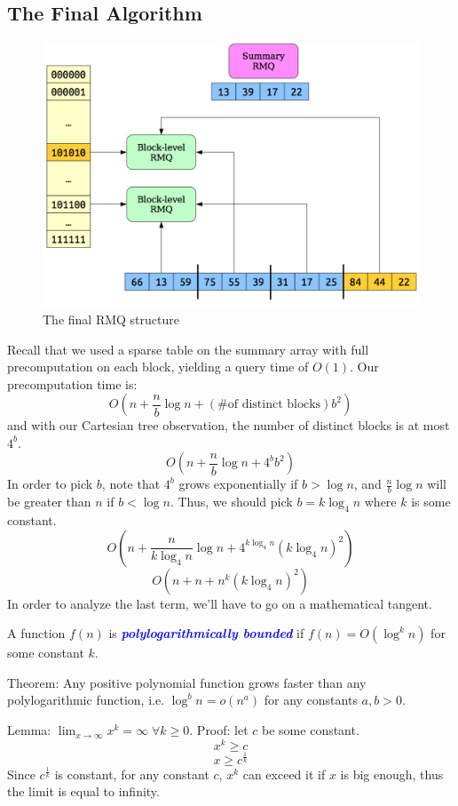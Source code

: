 \documentclass[11pt, oneside]{article}
\newcommand{\emphasis}[1]{\textcolor{blue}{\textbf{\textit{#1}}}}
\begin{document}
\subsection{The Final Algorithm}

\begin{figure}[h]
\centering
\includegraphics[scale=0.25]{final}
\caption{The final RMQ structure}
\end{figure}

Recall that we used a sparse table on the summary array with full precomputation on each block,
yielding a query time of \( O(1) \). Our precomputation time is:
\[ O(n + \frac{n}{b} \log n + (\text{\# of distinct blocks}) b^2) \]
and with our Cartesian tree observation, the number of distinct blocks is at most \( 4^b \).
\[ O(n + \frac{n}{b} \log n + 4^b b^2) \]
In order to pick \( b \), note that \( 4^b \) grows exponentially if \( b > \log n \), and \( \frac{n}{b} \log n \)
will be greater than \( n \) if \( b < \log n \). Thus, we should pick \( b = k \log_4 n \) where \( k \) is some constant.
\[ O(n + \frac{n}{k \log_4 n} \log n + 4^{k \log_4 n} (k \log_4 n)^2) \]
\[ O(n + n + n^k (k \log_4 n)^2) \]
In order to analyze the last term, we'll have to go on a mathematical tangent.

A function \( f(n) \) is \emphasis{polylogarithmically bounded} if \( f(n) = O( \log^k n) \)
for some constant \( k \).

Theorem: Any positive polynomial function grows faster than any polylogarithmic function,
i.e. \( \log^b n = o(n^a) \) for any constants \( a, b > 0 \).

Lemma: \( \lim_{x \to \infty} x^k = \infty \; \forall k \geq 0 \).
Proof: let \( c \) be some constant.
\[ x^k \geq c \]
\[ x \geq c^{\frac{1}{k}} \]
Since \( c^{\frac{1}{k}} \) is constant, for any constant \( c \), \( x^k \) can
exceed it if \( x \) is big enough, thus the limit is equal to infinity.
\end{document}
